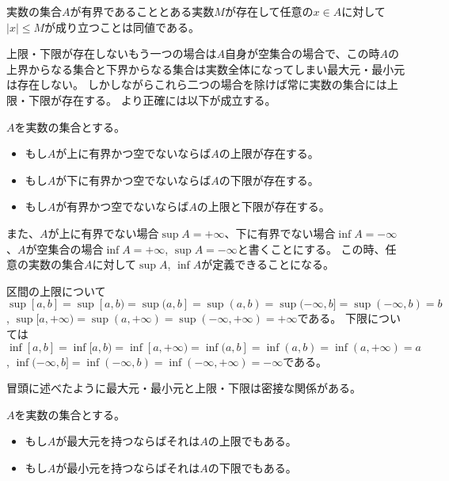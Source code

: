 \begin{remark}
実数の集合$A$が有界であることとある実数$M$が存在して任意の$x \in A$に対して$|x| \le M$が成り立つことは同値である。
\end{remark}

上限・下限が存在しないもう一つの場合は$A$自身が空集合の場合で、この時$A$の上界からなる集合と下界からなる集合は実数全体になってしまい最大元・最小元は存在しない。
しかしながらこれら二つの場合を除けば常に実数の集合には上限・下限が存在する。
より正確には以下が成立する。

\begin{proposition}[実数の連続性]
$A$を実数の集合とする。
\begin{itemize}
\item
もし$A$が上に有界かつ空でないならば$A$の上限が存在する。
\item
もし$A$が下に有界かつ空でないならば$A$の下限が存在する。
\item
もし$A$が有界かつ空でないならば$A$の上限と下限が存在する。
\end{itemize}
\end{proposition}

また、$A$が上に有界でない場合$\sup A = +\infty$、下に有界でない場合$\inf A = -\infty$、$A$が空集合の場合$\inf A = +\infty$, $\sup A = -\infty$と書くことにする。
この時、任意の実数の集合$A$に対して$\sup A$, $\inf A$が定義できることになる。

\begin{example}
区間の上限について
$\sup [a, b] = \sup [a, b) = \sup (a, b] = \sup (a, b) = \sup (-\infty, b] = \sup (-\infty, b) = b$, $\sup [a, +\infty) = \sup (a, +\infty) = \sup (-\infty, +\infty) = +\infty$である。
下限については
$\inf [a, b] = \inf [a, b) = \inf [a, +\infty) = \inf (a, b] = \inf (a, b) = \inf (a, +\infty) = a$, $\inf (-\infty, b] = \inf (-\infty, b) = \inf (-\infty, +\infty) = -\infty$である。
\end{example}

冒頭に述べたように最大元・最小元と上限・下限は密接な関係がある。

\begin{theorem}
$A$を実数の集合とする。
\begin{itemize}
\item
もし$A$が最大元を持つならばそれは$A$の上限でもある。
\item
もし$A$が最小元を持つならばそれは$A$の下限でもある。
\end{itemize}
\end{theorem}

